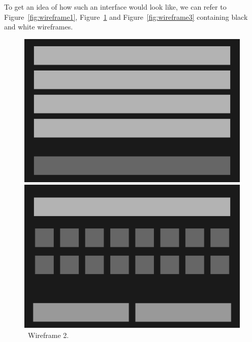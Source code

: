 To get an idea of how such an interface would look like, we can refer to Figure~\ref{fig:wireframe1}, Figure~\ref{fig:wireframe2} and Figure~\ref{fig:wireframe3} containing black and white wireframes.


\begin{figure}[h]
    \centering
    \begin{minipage}[b]{0.315\textwidth}
        \centering
        \includegraphics[width=\textwidth]{text/wireframe1.pdf}
        \caption{~Wireframe 1.}
        \label{fig:wireframe1}
    \end{minipage}
    \hfill
    \begin{minipage}[b]{0.315\textwidth}
        \centering
        \includegraphics[width=\textwidth]{text/wireframe2.pdf}
        \caption{~Wireframe 2.}
        \label{fig:wireframe2}
    \end{minipage}
    \hfill
    \begin{minipage}[b]{0.315\textwidth}

\end{minipage}
\end{figure}
